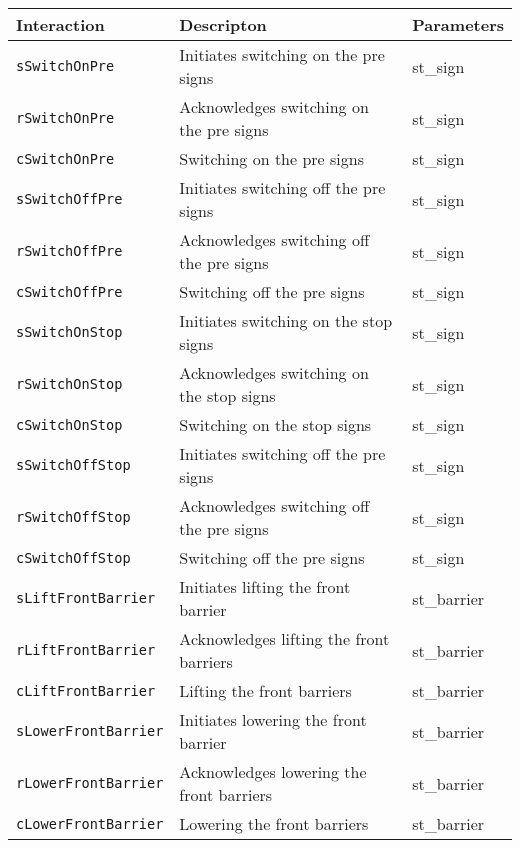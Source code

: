 \begin{table}%
\begin{tabular}{lll}
			\textbf{Interaction} &	\textbf{Descripton}	&	\textbf{Parameters}\\
  		\hline
  		
			\texttt{sSwitchOnPre} & Initiates switching on the pre signs & st\_sign\\
      \texttt{rSwitchOnPre} & Acknowledges switching on the pre signs & st\_sign\\
      \texttt{cSwitchOnPre} & Switching on the pre signs & st\_sign\\
      
      \texttt{sSwitchOffPre} & Initiates switching off the pre signs & st\_sign\\
      \texttt{rSwitchOffPre} & Acknowledges switching off the pre signs & st\_sign\\
      \texttt{cSwitchOffPre} & Switching off the pre signs & st\_sign\\
      
      \texttt{sSwitchOnStop} & Initiates switching on the stop signs & st\_sign\\
      \texttt{rSwitchOnStop} & Acknowledges switching on the stop signs & st\_sign\\
      \texttt{cSwitchOnStop} & Switching on the stop signs & st\_sign\\
      
      \texttt{sSwitchOffStop} & Initiates switching off the pre signs & st\_sign\\
      \texttt{rSwitchOffStop} & Acknowledges switching off the pre signs & st\_sign\\
      \texttt{cSwitchOffStop} & Switching off the pre signs & st\_sign\\
      
      \texttt{sLiftFrontBarrier} & Initiates lifting the front barrier & st\_barrier\\
      \texttt{rLiftFrontBarrier} & Acknowledges lifting the front barriers & st\_barrier\\
      \texttt{cLiftFrontBarrier} & Lifting the front barriers & st\_barrier\\
      
      \texttt{sLowerFrontBarrier} & Initiates lowering the front barrier & st\_barrier\\
      \texttt{rLowerFrontBarrier} & Acknowledges lowering the front barriers & st\_barrier\\
      \texttt{cLowerFrontBarrier} & Lowering the front barriers & st\_barrier\\
      

\end{tabular}
\end{table}
